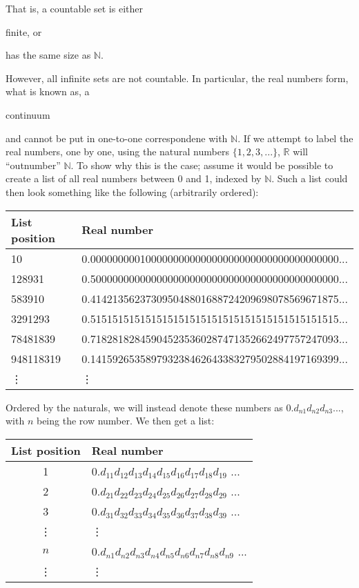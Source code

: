 \documentclass[11pt]{article}
\theoremstyle{plain}
\theoremstyle{definition}
\newenvironment{packed_items}{
\begin{itemize}
  \setlength{\itemsep}{1pt}
  \setlength{\parskip}{0pt}
  \setlength{\parsep}{0pt}
}{\end{itemize}}
\begin{document}
\noindent That is, a countable set is either 
\begin{packed_items}
\item finite, or 
\item has the same size as $ \mathbb{N} $. 
\end{packed_items}

\noindent However, all infinite sets are not countable. In particular, the real numbers form, what is known as, a \begin{em}continuum\end{em} and cannot be put in one-to-one correspondene with $ \mathbb{N} $. If we attempt to label the real numbers, one by one, using the natural numbers $ \{ 1, 2, 3, ... \} $, $ \mathbb{R} $ will ``outnumber'' $ \mathbb{N} $. To show why this is the case; assume it would be possible to create a list of all real numbers between 0 and 1, indexed by $ \mathbb{N} $. Such a list could then look something like the following (arbitrarily ordered): 
\begin{center}
\begin{tabular}{l l}
    List position & Real number \\
    \hline 
    10 & 0.000000000100000000000000000000000000000000000... \\
    128931 & 0.500000000000000000000000000000000000000000000... \\
    583910 & 0.414213562373095048801688724209698078569671875... \\
    3291293 & 0.515151515151515151515151515151515151515151515... \\
    78481839 & 0.718281828459045235360287471352662497757247093... \\
    948118319 & 0.141592653589793238462643383279502884197169399... \\
    \vdots & \vdots
\end{tabular} 
\end{center}

\noindent Ordered by the naturals, we will instead denote these numbers as $ 0.d_{n1}d_{n2}d_{n3}... $, with $ n $ being the row number. We then get a list: 
\begin{center}
\begin{tabular}{c l}
    List position & Real number \\
    \hline 
    1 & $ 0.d_{11}d_{12}d_{13}d_{14}d_{15}d_{16}d_{17}d_{18}d_{19} $ ... \\
    2 & $ 0.d_{21}d_{22}d_{23}d_{24}d_{25}d_{26}d_{27}d_{28}d_{29} $ ... \\
    3 & $ 0.d_{31}d_{32}d_{33}d_{34}d_{35}d_{36}d_{37}d_{38}d_{39} $ ... \\
    \vdots & \vdots \\
    $ n $ & $ 0.d_{n1}d_{n2}d_{n3}d_{n4}d_{n5}d_{n6}d_{n7}d_{n8}d_{n9} $ ... \\
    \vdots & \vdots
\end{tabular}
\end{center}
\end{document}
